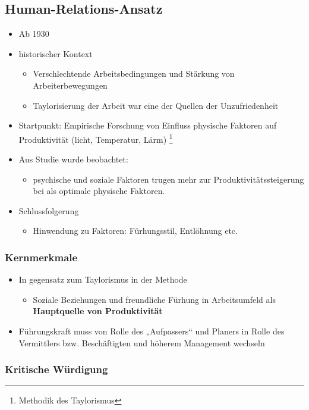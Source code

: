 \subsection{Human-Relations-Ansatz}
\begin{itemize}
    \item Ab 1930
    \item historischer Kontext
    \begin{itemize}
        \item Verschlechtende Arbeitsbedingungen und Stärkung von Arbeiterbewegungen
        \item Taylorisierung der Arbeit war eine der Quellen der Unzufriedenheit
    \end{itemize}
    \item Startpunkt: Empirische Forschung von Einfluss physische Faktoren auf Produktivität (licht, Temperatur, Lärm) \footnote{Methodik des Taylorismus}
    \item Aus Studie wurde beobachtet:
    \begin{itemize}
        \item psychische und soziale Faktoren trugen mehr zur Produktivitätssteigerung bei als optimale physische Faktoren. 
    \end{itemize}
    \item Schlussfolgerung
    \begin{itemize}
        \item Hinwendung zu Faktoren: Fürhungsstil, Entlöhnung etc. 
    \end{itemize}
\end{itemize}

\subsubsection{Kernmerkmale}
\begin{itemize}
    \item In gegensatz zum Taylorismus in der Methode
    \begin{itemize}
        \item Soziale Beziehungen und freundliche Fürhung in Arbeitsumfeld als \textbf{Hauptquelle von Produktivität}
    \end{itemize}
    \item Führungskraft muss von Rolle des „Aufpassers“ und Planers in Rolle
des Vermittlers bzw. Beschäftigten und höherem Management wechseln
\end{itemize}

\subsubsection{Kritische Würdigung}

